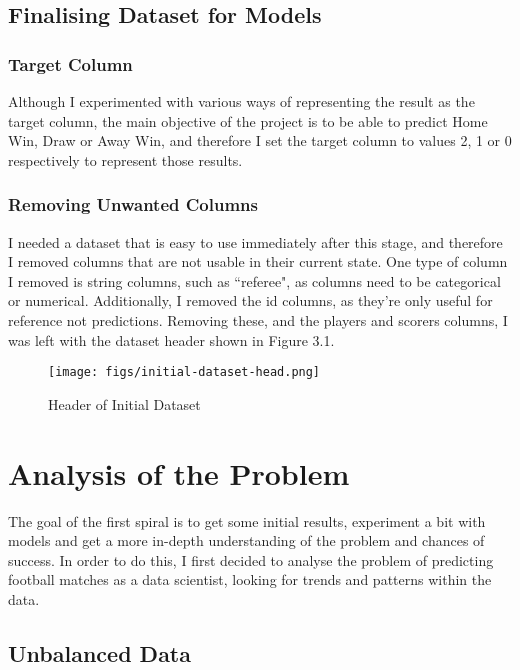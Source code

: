 \documentclass[12pt,a4paper,twoside,openright]{report}
\begin{document}
\subsection{Finalising Dataset for Models}

\subsubsection{Target Column}

Although I experimented with various ways of representing the result as the target column, the main objective of the project is to be able to predict Home Win, Draw or Away Win, and therefore I set the target column to values 2, 1 or 0 respectively to represent those results.

\subsubsection{Removing Unwanted Columns}

I needed a dataset that is easy to use immediately after this stage, and therefore I removed columns that are not usable in their current state. One type of column I removed is string columns, such as ``referee", as columns need to be categorical or numerical. Additionally, I removed the id columns, as they're only useful for reference not predictions. Removing these, and the players and scorers columns, I was left with the dataset header shown in Figure 3.1.

\begin{figure}
  \texttt{[image: figs/initial-dataset-head.png]}
  \caption{Header of Initial Dataset}
  \label{fig:initial-dataset-head}
\end{figure}

\section{Analysis of the Problem}

The goal of the first spiral is to get some initial results, experiment a bit with models and get a more in-depth understanding of the problem and chances of success. In order to do this, I first decided to analyse the problem of predicting football matches as a data scientist, looking for trends and patterns within the data.

\subsection{Unbalanced Data}
\end{document}

